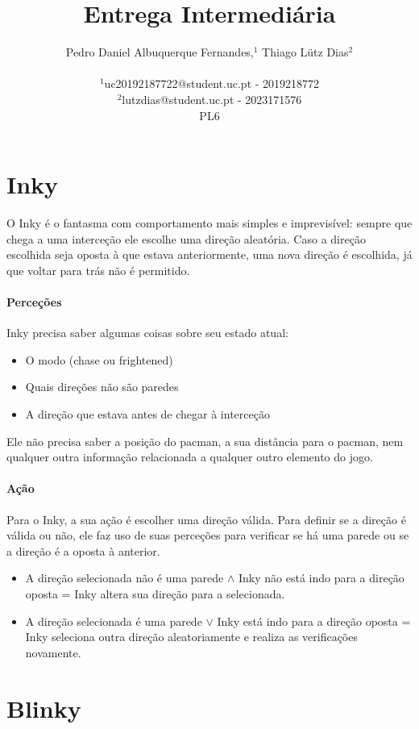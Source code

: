 \documentclass[12pt]{article}
\title{Entrega Intermediária}
\author{
Pedro Daniel Albuquerque Fernandes,$^{1}$ Thiago Lütz Dias$^{2}$\\
\\
\normalsize{$^{1}$uc20192187722@student.uc.pt - 2019218772}\\
\normalsize{$^{2}$lutzdias@student.uc.pt - 2023171576}\\
\small{PL6}\\
}
\date{}
\begin{document}
 

\maketitle 

\section*{Inky}

O Inky é o fantasma com comportamento mais simples e imprevisível: sempre que chega a uma interceção ele escolhe uma direção aleatória. Caso a direção escolhida seja oposta à que estava anteriormente, uma nova direção é escolhida, já que voltar para trás não é permitido.

\paragraph*{Perceções}
Inky precisa saber algumas coisas sobre seu estado atual:
\begin{itemize}
    \item O modo (chase ou frightened)
    \item Quais direções não são paredes
    \item A direção que estava antes de chegar à interceção
\end{itemize}

Ele não precisa saber a posição do pacman, a sua distância para o pacman, nem qualquer outra informação relacionada a qualquer outro elemento do jogo.

\paragraph*{Ação} 
Para o Inky, a sua ação é escolher uma direção válida. Para definir se a direção é válida ou não, ele faz uso de suas perceções para verificar se há uma parede ou se a direção é a oposta à anterior.
\begin{itemize}
    \item A direção selecionada não é uma parede $\land$ Inky não está indo para a direção oposta = Inky altera sua direção para a selecionada.

    \item A direção selecionada é uma parede $\lor$ Inky está indo para a direção oposta = Inky seleciona outra direção aleatoriamente e realiza as verificações novamente.
\end{itemize}

\section*{Blinky}
\end{document}
